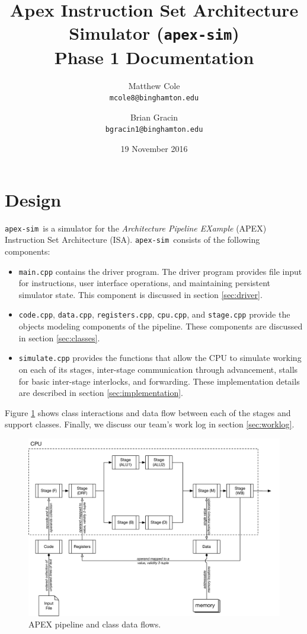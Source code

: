 \documentclass[12pt]{article}
\title{Apex Instruction Set Architecture Simulator (\texttt{apex-sim}) \\ Phase 1 Documentation}
\author{Matthew Cole \\ \texttt{mcole8@binghamton.edu}
\and
Brian Gracin \\ 
	\texttt{bgracin1@binghamton.edu}}
\date{19 November 2016}
\newcommand{\codename}[0]{\texttt{apex-sim}~}
\begin{document}
\maketitle
\tableofcontents
\newpage
\listoffigures
\listoftables
\newpage
{}


\section{Design}
\codename is a simulator for the \textit{Architecture Pipeline EXample} (APEX) Instruction Set Architecture (ISA).
\codename consists of the following components:
\begin{itemize}
  \item \texttt{main.cpp} contains the driver program. The driver program provides file input for instructions, user interface operations, and maintaining persistent simulator state. This component is discussed in section \ref{sec:driver}.
  \item \texttt{code.cpp}, \texttt{data.cpp}, \texttt{registers.cpp}, \texttt{cpu.cpp}, and \texttt{stage.cpp} provide the objects modeling components of the pipeline. These components are discussed in section \ref{sec:classes}.
  \item \texttt{simulate.cpp} provides the functions that allow the CPU to simulate working on each of its stages, inter-stage communication through advancement, stalls for basic inter-stage interlocks, and forwarding. These implementation details are described in section \ref{sec:implementation}.
\end{itemize}
Figure \ref{fig:overview} shows class interactions and data flow between each of the stages and support classes.
Finally, we discuss our team's work log in section \ref{sec:worklog}.

\begin{figure}
  \includegraphics[width=\linewidth]{./figs/apex-sim-overview.pdf}
  \caption{APEX pipeline and class data flows.}
  \label{fig:overview}
\end{figure}
\end{document}
